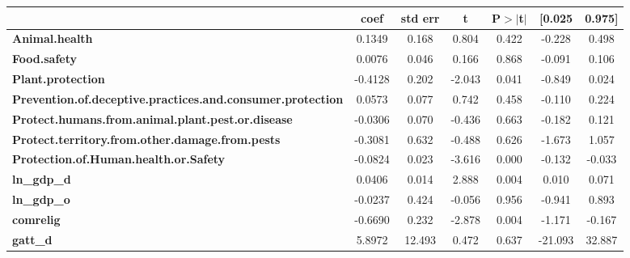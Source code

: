 \begin{center}
\begin{tabular}{lcccccc}
                                                                   & \textbf{coef} & \textbf{std err} & \textbf{t} & \textbf{P$> |$t$|$} & \textbf{[0.025} & \textbf{0.975]}  \\
\midrule
\textbf{Animal.health}                                             &       0.1349  &        0.168     &     0.804  &         0.422        &       -0.228    &        0.498     \\
\textbf{Food.safety}                                               &       0.0076  &        0.046     &     0.166  &         0.868        &       -0.091    &        0.106     \\
\textbf{Plant.protection}                                          &      -0.4128  &        0.202     &    -2.043  &         0.041        &       -0.849    &        0.024     \\
\textbf{Prevention.of.deceptive.practices.and.consumer.protection} &       0.0573  &        0.077     &     0.742  &         0.458        &       -0.110    &        0.224     \\
\textbf{Protect.humans.from.animal.plant.pest.or.disease}          &      -0.0306  &        0.070     &    -0.436  &         0.663        &       -0.182    &        0.121     \\
\textbf{Protect.territory.from.other.damage.from.pests}            &      -0.3081  &        0.632     &    -0.488  &         0.626        &       -1.673    &        1.057     \\
\textbf{Protection.of.Human.health.or.Safety}                      &      -0.0824  &        0.023     &    -3.616  &         0.000        &       -0.132    &       -0.033     \\
\textbf{ln\_gdp\_d}                                                &       0.0406  &        0.014     &     2.888  &         0.004        &        0.010    &        0.071     \\
\textbf{ln\_gdp\_o}                                                &      -0.0237  &        0.424     &    -0.056  &         0.956        &       -0.941    &        0.893     \\
\textbf{comrelig}                                                  &      -0.6690  &        0.232     &    -2.878  &         0.004        &       -1.171    &       -0.167     \\
\textbf{gatt\_d}                                                   &       5.8972  &       12.493     &     0.472  &         0.637        &      -21.093    &       32.887     \\

\end{tabular}
\end{center}
